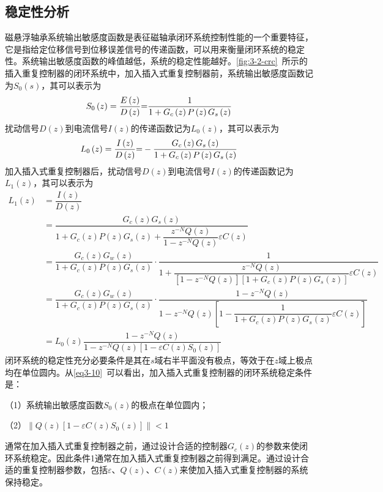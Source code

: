 \documentclass[
  lang=cn,
  degree=master,
  openany,oneside
]{nuaathesis}
\begin{document}
\subsection{稳定性分析}
磁悬浮轴承系统输出敏感度函数是表征磁轴承闭环系统控制性能的一个重要特征，它是指给定位移信号到位移误差信号的传递函数，可以用来衡量闭环系统的稳定性。系统输出敏感度函数的峰值越低，系统的稳定性能越好。\autoref{fig:3-2-crc}~所示的插入重复控制器的闭环系统中，加入插入式重复控制器前，系统输出敏感度函数记为$S_0(s)$，其可以表示为
\begin{equation}
{S_0}\left( z \right) = {{E\left( z \right)} \over {D\left( z \right)}}{\rm{ = }}{1 \over {1 + {G_c}\left( z \right)P\left( z \right){G_s}\left( z \right)}}
\end{equation}
扰动信号$D(z)$到电流信号$I(z)$的传递函数记为$L_0(z)$，其可以表示为
\begin{equation}
{L_0}\left( z \right) = {{I\left( z \right)} \over {D\left( z \right)}}{\rm{ = }} - {{{G_c}\left( z \right){G_s}\left( z \right)} \over {1 + {G_c}\left( z \right)P\left( z \right){G_s}\left( z \right)}}
\end{equation}
加入插入式重复控制器后，扰动信号$D(z)$到电流信号$I(z)$的传递函数记为$L_1(z)$，其可以表示为
\begin{equation}
\label{eq3-10}
\begin{aligned}
L_1(z)
&=\dfrac{I(z)}{D(z)}\\
&=\dfrac{G_c(z)G_s(z)}{1+G_c(z)P(z)G_s(z)+\dfrac{z^{-N}Q(z)}{1-z^{-N}Q(z)}\varepsilon C(z)}\\
&=\dfrac{G_c(z)G_w(z)}{1+G_c(z)P(z)G_s(z)}\cdot \dfrac{1}{1+\dfrac{z^{-N}Q(z)}{[1-z^{-N}Q(z)][1+G_c(z)P(z)G_s(z)]}\varepsilon C(z)}\\
&=\dfrac{G_c(z)G_w(z)}{1+G_c(z)P(z)G_s(z)}\cdot \dfrac{1-z^{-N}Q(z)}{1-z^{-N}Q(z)\left[1-\dfrac{1}{1+G_c(z)P(z)G_s(z)}\varepsilon C(z)\right]}\\
&=L_0(z)\dfrac{1-z^{-N}Q(z)}{1-z^{-N}Q(z)[1-\varepsilon C(z)S_0(z)]}
\end{aligned}
\end{equation}
闭环系统的稳定性充分必要条件是其在$s$域右半平面没有极点，等效于在$z$域上极点均在单位圆内。从\autoref{eq3-10}~可以看出，加入插入式重复控制器的闭环系统稳定条件是：

（1）系统输出敏感度函数$S_0(z)$的极点在单位圆内；

（2）$\left\| Q(z)[1 - \varepsilon C(z)S_0(z)] \right\| < 1$

通常在加入插入式重复控制器之前，通过设计合适的控制器$G_c(z)$的参数来使闭环系统稳定。因此条件1通常在加入插入式重复控制器之前得到满足。通过设计合适的重复控制器参数，包括$\varepsilon$、$Q(z)$、$C(z)$来使加入插入式重复控制器的系统保持稳定。
\end{document}
